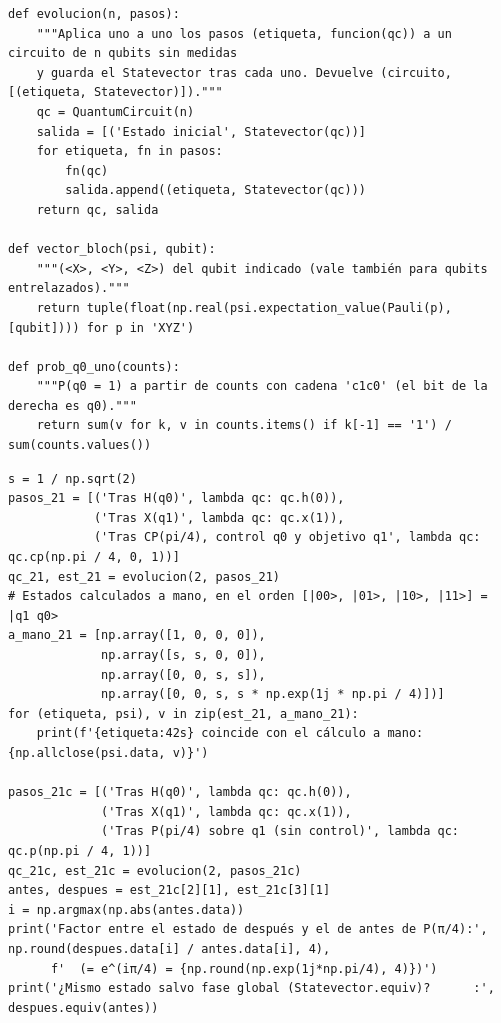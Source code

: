 \begin{lstlisting}[caption={Evolución paso a paso, vector de Bloch y probabilidad de medir $q_0=1$.},label={lst:b2_utilidades}]
def evolucion(n, pasos):
    """Aplica uno a uno los pasos (etiqueta, funcion(qc)) a un circuito de n qubits sin medidas
    y guarda el Statevector tras cada uno. Devuelve (circuito, [(etiqueta, Statevector)])."""
    qc = QuantumCircuit(n)
    salida = [('Estado inicial', Statevector(qc))]
    for etiqueta, fn in pasos:
        fn(qc)
        salida.append((etiqueta, Statevector(qc)))
    return qc, salida

def vector_bloch(psi, qubit):
    """(<X>, <Y>, <Z>) del qubit indicado (vale también para qubits entrelazados)."""
    return tuple(float(np.real(psi.expectation_value(Pauli(p), [qubit]))) for p in 'XYZ')

def prob_q0_uno(counts):
    """P(q0 = 1) a partir de counts con cadena 'c1c0' (el bit de la derecha es q0)."""
    return sum(v for k, v in counts.items() if k[-1] == '1') / sum(counts.values())
\end{lstlisting}

\begin{lstlisting}[caption={Ejercicio 2.1: $CP(\pi/4)$ con comprobación del cálculo a mano y caso sin control.},label={lst:b2_cp}]
s = 1 / np.sqrt(2)
pasos_21 = [('Tras H(q0)', lambda qc: qc.h(0)),
            ('Tras X(q1)', lambda qc: qc.x(1)),
            ('Tras CP(pi/4), control q0 y objetivo q1', lambda qc: qc.cp(np.pi / 4, 0, 1))]
qc_21, est_21 = evolucion(2, pasos_21)
# Estados calculados a mano, en el orden [|00>, |01>, |10>, |11>] = |q1 q0>
a_mano_21 = [np.array([1, 0, 0, 0]),
             np.array([s, s, 0, 0]),
             np.array([0, 0, s, s]),
             np.array([0, 0, s, s * np.exp(1j * np.pi / 4)])]
for (etiqueta, psi), v in zip(est_21, a_mano_21):
    print(f'{etiqueta:42s} coincide con el cálculo a mano: {np.allclose(psi.data, v)}')

pasos_21c = [('Tras H(q0)', lambda qc: qc.h(0)),
             ('Tras X(q1)', lambda qc: qc.x(1)),
             ('Tras P(pi/4) sobre q1 (sin control)', lambda qc: qc.p(np.pi / 4, 1))]
qc_21c, est_21c = evolucion(2, pasos_21c)
antes, despues = est_21c[2][1], est_21c[3][1]
i = np.argmax(np.abs(antes.data))
print('Factor entre el estado de después y el de antes de P(π/4):', np.round(despues.data[i] / antes.data[i], 4),
      f'  (= e^(iπ/4) = {np.round(np.exp(1j*np.pi/4), 4)})')
print('¿Mismo estado salvo fase global (Statevector.equiv)?      :', despues.equiv(antes))
\end{lstlisting}

